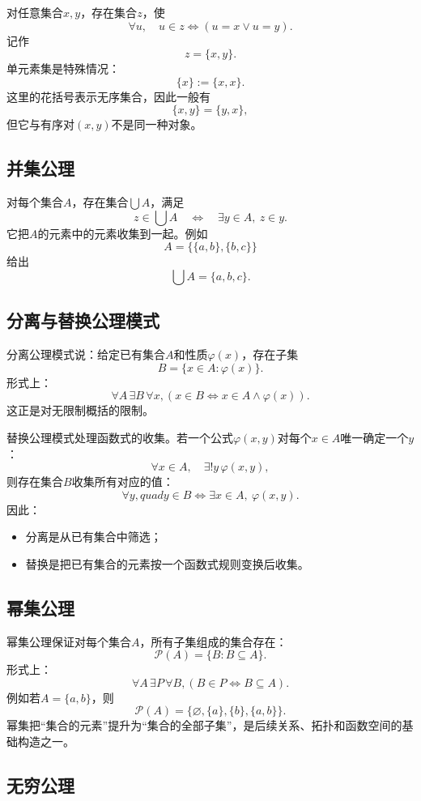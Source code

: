 对任意集合$x,y$，存在集合$z$，使
\[
    \forall u,\quad
    u\in z
    \Longleftrightarrow
    (u=x\lor u=y).
\]
记作
\[
    z=\{x,y\}.
\]
单元素集是特殊情况：
\[
    \{x\}:=\{x,x\}.
\]
这里的花括号表示无序集合，因此一般有
\[
    \{x,y\}=\{y,x\},
\]
但它与有序对$(x,y)$不是同一种对象。

\subsection{并集公理}

对每个集合$A$，存在集合$\bigcup A$，满足
\[
    z\in\bigcup A
    \quad\Longleftrightarrow\quad
    \exists y\in A,\ z\in y.
\]
它把$A$的元素中的元素收集到一起。例如
\[
    A=\bigl\{\{a,b\},\{b,c\}\bigr\}
\]
给出
\[
    \bigcup A=\{a,b,c\}.
\]

\subsection{分离与替换公理模式}

分离公理模式说：给定已有集合$A$和性质$\varphi(x)$，存在子集
\[
    B=\{x\in A:\varphi(x)\}.
\]
形式上：
\[
    \forall A\,\exists B\,\forall x,
    \left(x\in B\Leftrightarrow x\in A\land\varphi(x)\right).
\]
这正是对无限制概括的限制。

替换公理模式处理函数式的收集。若一个公式$\varphi(x,y)$对每个$x\in A$唯一确定一个$y$：
\[
    \forall x\in A,\quad \exists!y\,\varphi(x,y),
\]
则存在集合$B$收集所有对应的值：
\[
    \forall y,quad
    y\in B
    \Longleftrightarrow
    \exists x\in A,\ \varphi(x,y).
\]
因此：
\begin{itemize}
    \item 分离是从已有集合中筛选；
    \item 替换是把已有集合的元素按一个函数式规则变换后收集。
\end{itemize}

\subsection{幂集公理}

幂集公理保证对每个集合$A$，所有子集组成的集合存在：
\[
    \mathcal P(A)=\{B:B\subseteq A\}.
\]
形式上：
\[
    \forall A\,\exists P\,\forall B,
    \left(B\in P\Leftrightarrow B\subseteq A\right).
\]
例如若$A=\{a,b\}$，则
\[
    \mathcal P(A)
    =\{\varnothing,\{a\},\{b\},\{a,b\}\}.
\]
幂集把“集合的元素”提升为“集合的全部子集”，是后续关系、拓扑和函数空间的基础构造之一。

\subsection{无穷公理}

